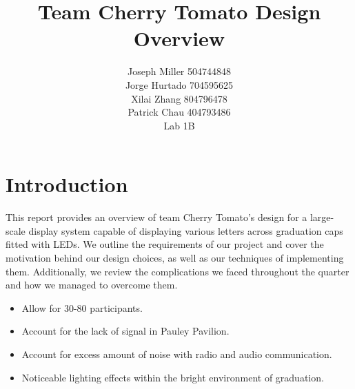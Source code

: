 \documentclass[a4paper,10pt]{article}
\begin{document}
%
   \title{Team Cherry Tomato Design Overview}

   \author{Joseph Miller 504744848 \\ Jorge Hurtado 704595625 \\ Xilai Zhang 804796478 \\ Patrick Chau 404793486
 \\ Lab 1B}
          
   \date{}

   \maketitle
   
   \tableofcontents
 
  \newpage
   
\section{Introduction}
This report provides an overview of team Cherry Tomato's design for a large-scale display system capable of displaying various letters across graduation caps fitted with LEDs. We outline the requirements of our project and cover the motivation behind our design choices, as well as our techniques of implementing them. Additionally, we review the complications we faced throughout the quarter and how we managed to overcome them. 
\begin{itemize}
	\item Allow for 30-80 participants.
	\item Account for the lack of signal in Pauley Pavilion.
	\item Account for excess amount of noise with radio and audio communication.
	\item Noticeable lighting effects within the bright environment of graduation.
\end{itemize}
\end{document}
